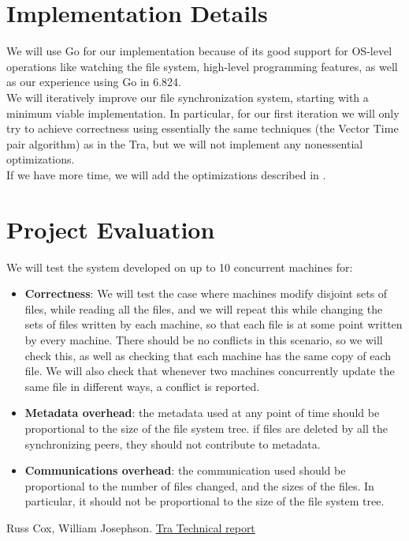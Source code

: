 \section{Implementation Details}
We will use Go for our implementation because of its good support for OS-level operations like watching the file system, high-level programming features, as well as our experience using Go in 6.824.\\

\noindent We will iteratively improve our file synchronization system, starting with a minimum viable implementation.  In particular, for our first iteration we will only try to achieve correctness using essentially the same techniques (the Vector Time pair algorithm) as in the Tra, but we will not implement any nonessential optimizations.\\

\noindent If we have more time, we will add the optimizations described in \cite{tra-tech-report}.

\section{Project Evaluation}
We will test the system developed on up to 10 concurrent machines for:
\begin{itemize}\renewcommand{\labelitemi}{$\diamond$}
\item {\bf Correctness}: We will test the case where machines modify disjoint sets of files, while reading all the files, and we will repeat this while changing the sets of files written by each machine, so that each file is at some point written by every machine.  There should be no conflicts in this scenario, so we will check this, as well as checking that each machine has the same copy of each file.  We will also check that whenever two machines concurrently update the same file in different ways, a conflict is reported.

\item {\bf Metadata overhead}: the metadata used at any point of time should be proportional to the size of the file system tree. if files are deleted by all the synchronizing peers, they should not contribute to metadata.

\item {\bf Communications overhead}: the communication used should be proportional to the number of files changed, and the sizes of the files. In particular, it should not be proportional to the size of the file system tree.
\end{itemize}

\begin{thebibliography}{1}
\newblock Russ Cox, William Josephson.
\newblock \href{http://publications.csail.mit.edu/tmp/MIT-CSAIL-TR-2005-014.pdf}{Tra Technical report}
\end{thebibliography}

